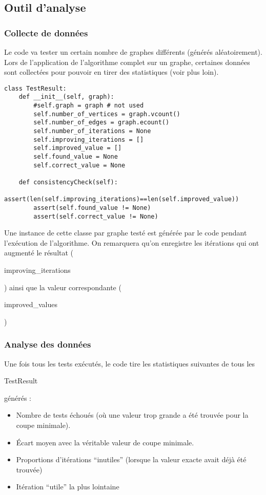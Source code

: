 \documentclass[a4paper,10pt]{article}
\begin{document}
\subsection{Outil d'analyse}
\subsubsection{Collecte de données}
Le code va tester un certain nombre de graphes différents (générés aléatoirement). Lors de l'application de l'algorithme complet sur un graphe, certaines données sont collectées pour pouvoir en tirer des statistiques (voir plus loin).
\begin{lstlisting}
class TestResult:
	def __init__(self, graph):
		#self.graph = graph # not used
		self.number_of_vertices = graph.vcount()
		self.number_of_edges = graph.ecount()
		self.number_of_iterations = None
		self.improving_iterations = []
		self.improved_value = []
		self.found_value = None
		self.correct_value = None

	def consistencyCheck(self):
		assert(len(self.improving_iterations)==len(self.improved_value))
		assert(self.found_value != None)
		assert(self.correct_value != None)
\end{lstlisting}
\fontfamily{}
Une instance de cette classe par graphe testé est générée par le code pendant l'exécution de l'algorithme.
On remarquera qu'on enregistre les itérations qui ont augmenté le résultat
(\begin{it}improving\_iterations\end{it})
ainsi que la valeur correspondante
(\begin{it}improved\_values\end{it})

\subsubsection{Analyse des données}
Une fois tous les tests exécutés, le code tire les statistiques suivantes de tous les
\begin{it}TestResult\end{it}
générés :
\begin{itemize}
 \item Nombre de tests échoués (où une valeur trop grande a été trouvée pour la coupe minimale).
 \item Écart moyen avec la véritable valeur de coupe minimale.
 \item Proportions d'itérations ``inutiles'' (lorsque la valeur exacte avait déjà été trouvée)
 \item Itération ``utile'' la plus lointaine
\end{itemize}
\end{document}
